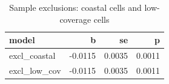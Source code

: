 \begin{table}[htbp]
\centering
\caption{Sample exclusions: coastal cells and low-coverage cells}
\label{tab:excl}
\begin{tabular}{lrrr}
\hline
model & b & se & p
\\ \hline
excl\_coastal & -0.0115 & 0.0035 & 0.0011 \\
excl\_low\_cov & -0.0115 & 0.0035 & 0.0011 \\
\hline
\end{tabular}
\end{table}
